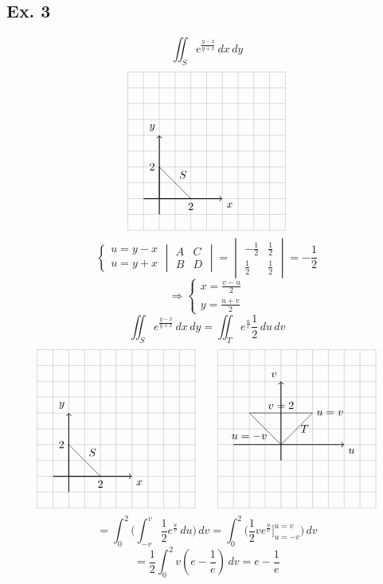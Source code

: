\documentclass[12pt]{article}
\begin{document}
\subsection*{Ex. 3}
    \[
        \iint_Se^{\frac{y-x}{y+x}}\,dx\,dy     
    \]
    \[
        \begin{tikzpicture}[scale=0.5]
            \draw[thick,->] (-1,0) -- (4,0) node[anchor=north west] {$x$};
            \draw[thick,->] (0,-1) -- (0,4) node[anchor=south east] {$y$};
            \draw[step=1cm,gray,very thin] (-2,-2) grid (8,8);
            \draw (0, 0) -- (0,2) -- (2,0) -- cycle;
            \draw (1.5,2) node[anchor=north]{$S$};
            \draw (1pt,2 cm) -- (-1pt,2 cm) node[anchor=east] {$2$};
            \draw (2 cm,1pt) -- (2 cm,-1pt) node[anchor=north] {$2$};
        \end{tikzpicture}
    \]
    \[
        \begin{cases}
            u=y-x \\
            u=y+x
        \end{cases}
        \begin{vmatrix*}
            A & C \\
            B & D
        \end{vmatrix*}
        =
        \begin{vmatrix*}
            -\frac{1}{2} & \frac{1}{2} \\
            \frac{1}{2} & \frac{1}{2}
        \end{vmatrix*}
        = -\frac{1}{2}
    \]
    \[
        \Rightarrow
        \begin{cases}
            x=\frac{v-u}{2} \\
            y=\frac{u+v}{2}
        \end{cases}
    \]
    \[ \iint_Se^{\frac{y-x}{y+x}}\,dx\,dy=\iint_Te^{\frac{u}{v}}\frac{1}{2}\,du\,dv \]
    \[
        \begin{tikzpicture}[scale=0.5]
            \draw[thick,->] (-1,0) -- (4,0) node[anchor=north west] {$x$};
            \draw[thick,->] (0,-1) -- (0,4) node[anchor=south east] {$y$};
            \draw[step=1cm,gray,very thin] (-2,-2) grid (8,8);
            \draw (0, 0) -- (0,2) -- (2,0) -- cycle;
            \draw (1.5,2) node[anchor=north]{$S$};
            \draw (1pt,2 cm) -- (-1pt,2 cm) node[anchor=east] {$2$};
            \draw (2 cm,1pt) -- (2 cm,-1pt) node[anchor=north] {$2$};
        \end{tikzpicture}
        \quad\quad
        \begin{tikzpicture}[scale=0.5]
            \draw[thick,->] (-3,0) -- (4,0) node[anchor=north west] {$u$};
            \draw[thick,->] (0,-1) -- (0,4) node[anchor=south east] {$v$};
            \draw[step=1cm,gray,very thin] (-4,-4) grid (6,6);
            \draw (0, 0) -- (-2,2) -- (2,2) node[anchor=west]{$u=v$} -- cycle;
            \draw (0, 2) node[anchor=south]{$v=2$};
            \draw (-2, 1) node[anchor=north]{$u=-v$};
            \draw (1.5,1.5) node[anchor=north]{$T$};
        \end{tikzpicture}
    \]
    \[
       =\int_0^2\bigg(\int_{-v}^v\frac{1}{2}e^{\frac{u}{v}}\,du\bigg)\,dv=\int_0^2\bigg(\frac{1}{2}ve^{\frac{u}{v}}\bigg]_{u=-v}^{u=v}\bigg)\,dv 
    \]
    \[
      =\frac{1}{2}\int_0^2v(e-\frac{1}{e})\,dv=e-\frac{1}{e}  
    \]
\end{document}
